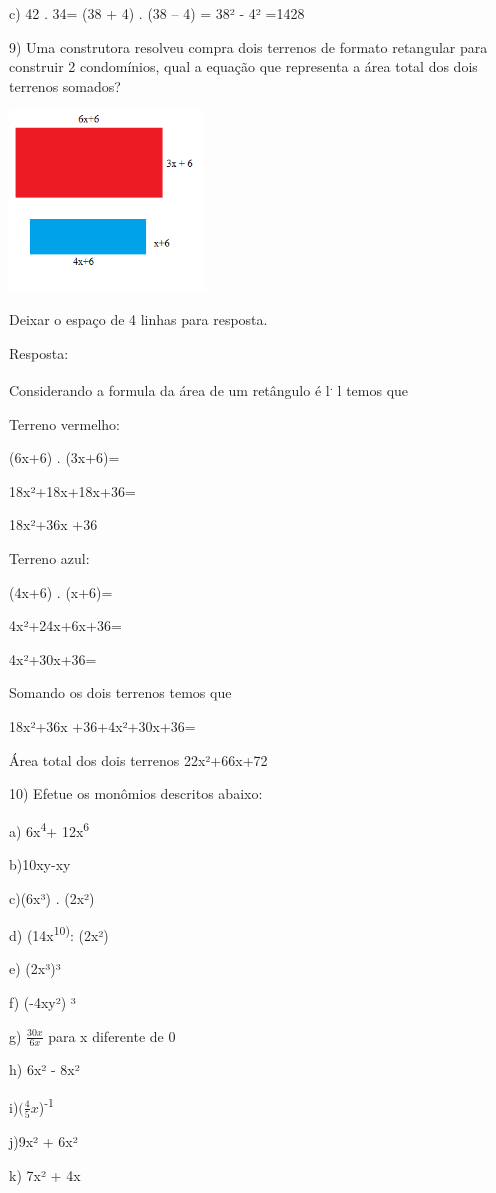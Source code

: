 c) 42 . 34= (38 + 4) . (38 -- 4) = 38² - 4² =1428

9) Uma construtora resolveu compra dois terrenos de formato retangular
para construir 2 condomínios, qual a equação que representa a área total
dos dois terrenos somados?

\includegraphics[width=2.04167in,height=1.8873in]{./imgSAEB_8_MAT/media/image5.png}

Deixar o espaço de 4 linhas para resposta.

Resposta:

Considerando a formula da área de um retângulo é l\textsuperscript{.} l
temos que

Terreno vermelho:

(6x+6) . (3x+6)=

18x²+18x+18x+36=

18x²+36x +36

Terreno azul:

(4x+6) . (x+6)=

4x²+24x+6x+36=

4x²+30x+36=

Somando os dois terrenos temos que

18x²+36x +36+4x²+30x+36=

Área total dos dois terrenos 22x²+66x+72

10) Efetue os monômios descritos abaixo:

a) 6x\textsuperscript{4}+ 12x\textsuperscript{6}

b)10xy-xy

c)(6x³) . (2x²)

d) (14x\textsuperscript{10)}: (2x²)

e) (2x³)³

f) (-4xy²) ³

g) \(\frac{30x}{6x}\) para x diferente de 0

h) 6x² - 8x²

i)\((\frac{4}{5}x\))\textsuperscript{-1}

j)9x² + 6x²

k) 7x² + 4x

